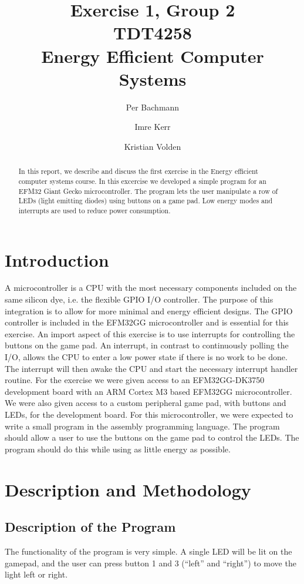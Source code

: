 \documentclass[a4paper, 12pt]{article}
\title{Exercise 1, Group 2 \\ TDT4258 \\ Energy Efficient Computer Systems}
\author{Per Bachmann \and Imre Kerr \and Kristian Volden}
\begin{document}
\maketitle
\begin{abstract}
	In this report, we describe and discuss the first exercise in the Energy efficient computer systems course. In this excercise we developed a simple program for an EFM32 Giant Gecko microcontroller. The program lets the user manipulate a row of LEDs (light emitting diodes) using buttons on a game pad. Low energy modes and interrupts are used to reduce power consumption.
\end{abstract}
\section{Introduction} %
\label{sec:introduction}
	A microcontroller is a CPU with the most necessary components included on the same silicon dye, i.e. the flexible GPIO I/O controller. The purpose of this integration is to allow for more minimal and energy efficient designs. The GPIO controller is included in the EFM32GG microcontroller and is essential for this exercise.
	An import aspect of this exercise is to use interrupts for controlling the buttons on the game pad. An interrupt, in contrast to continuously polling the I/O, allows the CPU to enter a low power state if there is no work to be done. The interrupt will then awake the CPU and start the necessary interrupt handler routine.
	For the exercise we were given access to an EFM32GG-DK3750 development board with an ARM Cortex M3 based EFM32GG microcontroller. We were also given access to a custom peripheral game pad, with buttons and LEDs, for the development board. For this microcontroller, we were expected to write a small program in the assembly programming language. The program should allow a user to use the buttons on the game pad to control the LEDs. The program should do this while using as little energy as possible.

\section{Description and Methodology} %
\label{sec:description_and_methodology}
    \subsection{Description of the Program} %
    \label{sub:description_of_program}
        The functionality of the program is very simple. A single LED will be lit on the gamepad, and the user can press button 1 and 3 (``left'' and ``right'') to move the light left or right.
\end{document}

